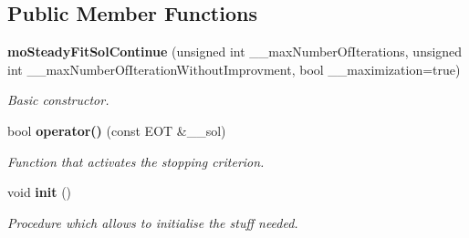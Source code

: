 \subsection*{Public Member Functions}
\begin{CompactItemize}
\item 
{\bf moSteadyFitSolContinue} (unsigned int \_\-\_\-maxNumberOfIterations, unsigned int \_\-\_\-maxNumberOfIterationWithoutImprovment, bool \_\-\_\-maximization=true)
\begin{CompactList}\small\item\em Basic constructor. \item\end{CompactList}\item 
bool {\bf operator()} (const EOT \&\_\-\_\-sol)
\begin{CompactList}\small\item\em Function that activates the stopping criterion. \item\end{CompactList}\item 
void {\bf init} ()\label{classmo_steady_fit_sol_continue_87563493addc8e4b58982c55a67179b9}

\begin{CompactList}\small\item\em Procedure which allows to initialise the stuff needed. \item\end{CompactList}\end{CompactItemize}
